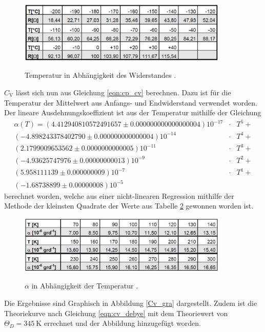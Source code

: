 \begin{figure}[!h]
	\centering
	\caption[]{Temperatur in Abhängigkeit des Widerstandes \cite{V47}.}
	\includegraphics[width = 10cm]{img/temperatur.png}	
	\label{Temperatur}
\end{figure}

$C_\mathrm{V}$ lässt sich nun aus Gleichung \eqref{eqn:cp_cv} 
berechnen.
Dazu ist für die Temperatur der Mittelwert aus Anfangs- und Endwiderstand verwendet worden.
Der lineare Ausdehnungskoeffizient ist aus der Temperatur mithilfe der Gleichung
\begin{eqnarray*}
	\alpha(T) = 
	(4.412940810572491657\pm0.000000000000000004)10^{-17} &\cdot& T^5 +\\
	(-4.898243378402790\pm0.000000000000004)10^{-14} &\cdot& T^4 + \\
	(2.1799009653562\pm0.0000000000005)10^{-11} &\cdot& T^3 + \\
	(-4.93625747976\pm0.00000000013)10^{-9} &\cdot& T^2 + \\
	(5.958111139\pm0.000000009)10^{-7} &\cdot& T^1 + \\
	(-1.68738899\pm0.00000008)10^{-5} &&
\end{eqnarray*}
berechnet worden, welche aus einer nicht-linearen Regression mithilfe der Methode der kleinsten Quadrate der Werte aus Tabelle \ref{Alpha} gewonnen worden ist.

\begin{figure}[!h]
	\centering
	\caption[]{$\alpha$ in Abhängigkeit der Temperatur \cite{V47}.}
	\includegraphics[width = 10cm]{img/alpha.png}	
	\label{Alpha}
\end{figure}

Die Ergebnisse sind Graphisch in Abbildung \ref{Cv_gra} dargestellt.
Zudem ist die Theoriekurve nach Gleichung \eqref{eqn:cv_debye} mit dem Theoriewert von $\Theta_D = \SI{345}{\kelvin}$ \cite{kupfer3} errechnet und der Abbildung hinzugefügt worden.

